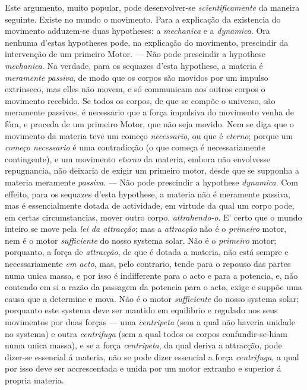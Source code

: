 {Este argumento, muito popular, pode desenvolver-se \emph{scientificamente} da maneira
seguinte. Existe no mundo o movimento. Para a explicação da existencia do movimento
adduzem-se duas hypotheses: a \emph{mechanica} e a \emph{dynamica}. Ora nenhuma d'estas
hypotheses pode, na explicação do movimento, prescindir da intervenção de um primeiro
Motor. --- Não pode prescindir a hypothese \emph{mechanica}. Na verdade, para os
sequazes d'esta hypothese, a materia é \emph{meramente passiva}, de modo que os corpos
são movidos por um impulso extrinseco, mas elles não movem, e só communicam aos outros
corpos o movimento recebido. Se todos os corpos, de que se compõe o universo, são
meramente passivos, é necessario que a força impulsiva do movimento venha de fóra, e
proceda de um primeiro Motor, que não seja movido. Nem se diga que o movimento da
materia teve um começo \emph{necessario}, ou que é \emph{eterno}; porque um \emph{começo
necessario} é uma contradicção (o que começa é necessariamente contingente), e um
movimento \emph{eterno} da materia, embora não envolvesse repugnancia, não deixaria de
exigir um primeiro motor, desde que se supponha a materia meramente \emph{passiva}. ---
Não pode prescindir a hypothese \emph{dynamica}. Com effeito, para os sequazes d'esta
hypothese, a materia não é meramente passiva, mas é essencialmente dotada de
actividade, em virtude da qual um corpo pode, em certas circumstancias, mover outro
corpo, \emph{attrahendo-o}. E' certo que o mundo inteiro se move pela \emph{lei da
attracção}; mas a \emph{attracção} não é o \emph{primeiro} motor, nem é o motor
\emph{sufficiente} do nosso systema solar. Não é o \emph{primeiro} motor; porquanto, a
força de \emph{attracção}, de que é dotada a materia, não está sempre e necessariamente
\emph{em acto}, mas, pelo contrario, tende para o repouso das partes numa unica massa, e
por isso é indifferente para o acto e para a potencia, e, não contendo em si a razão da
passagem da potencia para o acto, exige e suppõe uma causa que a determine e mova. Não
é o motor \emph{sufficiente} do nosso systema solar; porquanto este systema deve ser
mantido em equilibrio e regulado nos seus movimentos por duas forças --- uma
\emph{centripeta} (sem a qual não haveria unidade no systema) e outra \emph{centrifuga}
(sem a qual todos os corpos confundir-se-hiam numa unica massa), e se a força
\emph{centripeta}, da qual deriva a attracção, pode dizer-se essencial á materia, não
se pode dizer essencial a força \emph{centrifuga}, a qual por isso deve ser
accrescentada e unida por um motor extranho e superior á propria materia.

}

